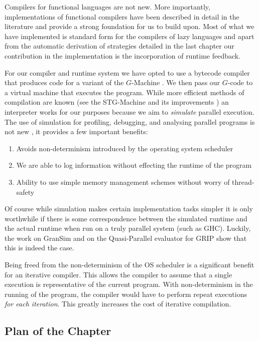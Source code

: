 Compilers for functional languages are not new. More importantly,
implementations of functional compilers have been described in detail in the
literature and provide a strong foundation for us to build upon. Most of what
we have implemented is standard form for the compilers of lazy languages and
apart from the automatic derivation of strategies detailed in the last chapter
our contribution in the implementation is the incorporation of runtime
feedback.

For our compiler and runtime system we have opted to use a bytecode compiler
that produces code for a variant of the $G$-Machine \citep{LazyMLCompiler}. We
then pass our $G$-code to a virtual machine that executes the program. While
more efficient methods of compilation are known (see the STG-Machine and its
improvements \citep{jones1992implementing, marlow2006making}) an interpreter
works for our purposes because we aim to \emph{simulate} parallel execution.
The use of simulation for profiling, debugging, and analysing parallel programs
is not new \citep{gransim} , it provides a few important
benefits:

\begin{enumerate}
    \item Avoids non-determinism introduced by the operating system scheduler
    \item We are able to log information without effecting the runtime of the
            program
    \item Ability to use simple memory management schemes without worry of
            thread-safety
\end{enumerate}

Of course while simulation makes certain implementation tasks simpler it is
only worthwhile if there is some correspondence between the simulated runtime
and the actual runtime when run on a truly parallel system (such as GHC).
Luckily, the work on GranSim and on the Quasi-Parallel evaluator for GRIP
\citep{GRIP} show that this is indeed the case.

Being freed from the non-determinism of the OS scheduler is a significant
benefit for an iterative compiler. This allows the compiler to assume that a
single execution is representative of the current program. With non-determinism
in the running of the program, the compiler would have to perform repeat
executions \emph{for each iteration}.  This greatly increases the cost of
iterative compilation.

\subsection*{Plan of the Chapter}

